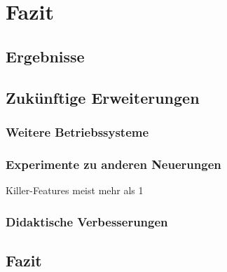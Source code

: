 \chapter{Fazit}
\label{chap:evaluation}


\section{Ergebnisse}
\label{sec:results}



		
		

\section{Zukünftige Erweiterungen}
\label{sec:future}

		\subsection{Weitere Betriebssysteme}
	
		\subsection{Experimente zu anderen Neuerungen}
		
		Killer-Features meist mehr als 1				
		

		\subsection{Didaktische Verbesserungen}


\section{Fazit}
\label{sec:evaluation}
	